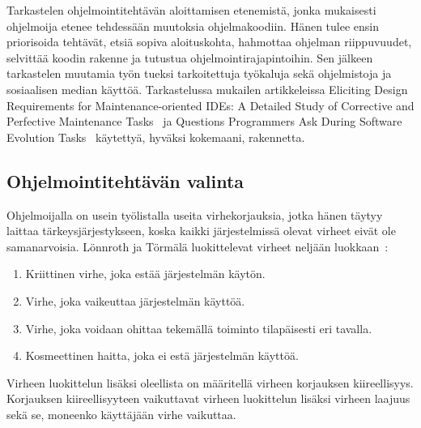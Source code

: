 \documentclass[finnish]{tktltiki2}
\theoremstyle{definition}
\theoremstyle{remark}
\begin{document}
Tarkastelen ohjelmointitehtävän aloittamisen etenemistä, jonka mukaisesti ohjelmoija etenee tehdessään muutoksia ohjelmakoodiin. Hänen tulee ensin priorisoida tehtävät, etsiä sopiva aloituskohta, hahmottaa ohjelman riippuvuudet, selvittää koodin rakenne ja tutustua ohjelmointirajapintoihin. Sen jälkeen tarkastelen muutamia työn tueksi tarkoitettuja työkaluja sekä ohjelmistoja ja sosiaalisen median käyttöä. Tarkastelussa mukailen artikkeleissa Eliciting Design Requirements for Maintenance-oriented IDEs: A Detailed Study of Corrective and Perfective Maintenance Tasks~\cite{eliciting-design-requirements-for-maintenance-oriented-ides} ja Questions Programmers Ask During Software Evolution Tasks~\cite{questions-during-software-evolution-tasks} käytettyä, hyväksi kokemaani, rakennetta.

\subsection{Ohjelmointitehtävän valinta}

Ohjelmoijalla on usein työlistalla useita virhekorjauksia, jotka hänen täytyy laittaa tärkeysjärjestykseen, koska kaikki järjestelmissä olevat virheet eivät ole samanarvoisia. Lönnroth ja Törmälä luokittelevat virheet neljään luokkaan~\cite{testaus-kriittisyys}:
\begin{enumerate}
  \item Kriittinen virhe, joka estää järjestelmän käytön.
  \item Virhe, joka vaikeuttaa järjestelmän käyttöä.
  \item Virhe, joka voidaan ohittaa tekemällä toiminto tilapäisesti eri tavalla.
  \item Kosmeettinen haitta, joka ei estä järjestelmän käyttöä.
\end{enumerate}

Virheen luokittelun lisäksi oleellista on määritellä virheen korjauksen kiireellisyys. Korjauksen kiireellisyyteen vaikuttavat virheen luokittelun lisäksi virheen laajuus sekä se, moneenko käyttäjään virhe vaikuttaa.

\end{document}
